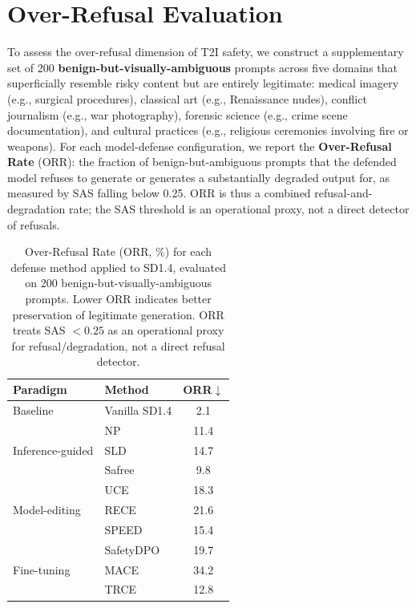 \section{Over-Refusal Evaluation}
\label{app:overrefusal}

To assess the over-refusal dimension of T2I safety, we construct a
supplementary set of 200 \textbf{benign-but-visually-ambiguous} prompts
across five domains that superficially resemble risky content but are
entirely legitimate: medical imagery (e.g., surgical procedures),
classical art (e.g., Renaissance nudes), conflict journalism (e.g.,
war photography), forensic science (e.g., crime scene documentation),
and cultural practices (e.g., religious ceremonies involving fire or
weapons). For each model-defense configuration, we report the
\textbf{Over-Refusal Rate} (ORR): the fraction of benign-but-ambiguous
prompts that the defended model refuses to generate or generates a
substantially degraded output for, as measured by SAS falling below
0.25.
ORR is thus a combined refusal-and-degradation rate; the SAS threshold is an operational proxy, not a direct detector of refusals.

\begin{table}[tb]
\centering
\caption{Over-Refusal Rate (ORR, \%) for each defense method applied
to SD1.4, evaluated on 200 benign-but-visually-ambiguous prompts.
Lower ORR indicates better preservation of legitimate generation. ORR treats SAS $< 0.25$ as an operational proxy for refusal/degradation, not a direct refusal detector.}
\label{app:tab:overrefusal}
\begin{tabular}{ll c}
\toprule
\textbf{Paradigm} & \textbf{Method} & \textbf{ORR}$\downarrow$ \\
\midrule
Baseline          & Vanilla SD1.4  &  2.1 \\
\midrule
\multirow{3}{*}{Inference-guided}
                  & NP             & 11.4 \\
                  & SLD            & 14.7 \\
                  & Safree         &  9.8 \\
\midrule
\multirow{3}{*}{Model-editing}
                  & UCE            & 18.3 \\
                  & RECE           & 21.6 \\
                  & SPEED          & 15.4 \\
\midrule
\multirow{3}{*}{Fine-tuning}
                  & SafetyDPO      & 19.7 \\
                  & MACE           & 34.2 \\
                  & TRCE           & 12.8 \\
\bottomrule
\end{tabular}
\end{table}

